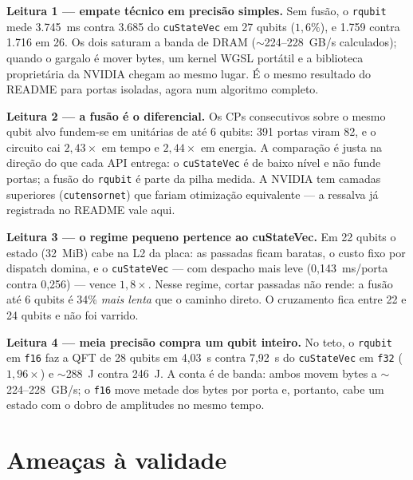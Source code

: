 \documentclass[11pt,a4paper]{article}
\begin{document}
\textbf{Leitura 1 --- empate técnico em precisão simples.} Sem fusão, o
\texttt{rqubit} mede 3.745~ms contra 3.685 do \texttt{cuStateVec} em 27
qubits ($1{,}6\%$), e 1.759 contra 1.716 em 26. Os dois saturam a banda de
DRAM ($\sim$224--228~GB/s calculados); quando o gargalo é mover bytes, um
kernel WGSL portátil e a biblioteca proprietária da NVIDIA chegam ao mesmo
lugar. É o mesmo resultado do README para portas isoladas, agora num
algoritmo completo.

\textbf{Leitura 2 --- a fusão é o diferencial.} Os CPs consecutivos sobre o
mesmo qubit alvo fundem-se em unitárias de até 6 qubits: 391 portas viram 82,
e o circuito cai $2{,}43\times$ em tempo e $2{,}44\times$ em energia. A
comparação é justa na direção do que cada API entrega: o \texttt{cuStateVec}
é de baixo nível e não funde portas; a fusão do \texttt{rqubit} é parte da
pilha medida. A NVIDIA tem camadas superiores (\texttt{cutensornet}) que
fariam otimização equivalente --- a ressalva já registrada no README vale
aqui.

\textbf{Leitura 3 --- o regime pequeno pertence ao cuStateVec.} Em 22 qubits o
estado (32~MiB) cabe na L2 da placa: as passadas ficam baratas, o custo fixo
por dispatch domina, e o \texttt{cuStateVec} --- com despacho mais leve
(0,143~ms/porta contra 0,256) --- vence $1{,}8\times$. Nesse regime, cortar
passadas não rende: a fusão até 6 qubits é 34\% \emph{mais lenta} que o
caminho direto. O cruzamento fica entre 22 e 24 qubits e não foi varrido.

\textbf{Leitura 4 --- meia precisão compra um qubit inteiro.} No teto, o
\texttt{rqubit} em \texttt{f16} faz a QFT de 28 qubits em 4,03~s contra 7,92~s
do \texttt{cuStateVec} em \texttt{f32} ($1{,}96\times$) e $\sim$288~J contra
246~J. A conta é de banda: ambos movem bytes a $\sim$224--228~GB/s; o
\texttt{f16} move metade dos bytes por porta e, portanto, cabe um estado com
o dobro de amplitudes no mesmo tempo.

\section{Ameaças à validade}
\end{document}
